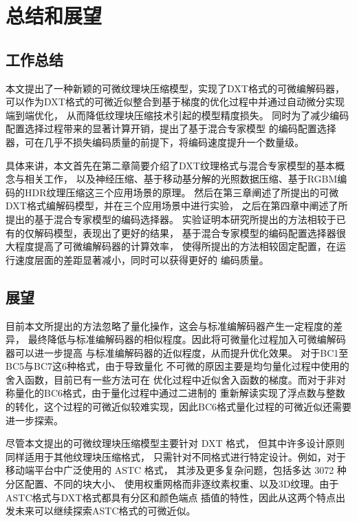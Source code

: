 
\chapter{总结和展望}

\section{工作总结}

本文提出了一种新颖的可微纹理块压缩模型，实现了DXT格式的可微编解码器，
可以作为DXT格式的可微近似整合到基于梯度的优化过程中并通过自动微分实现端到端优化，
从而降低纹理块压缩技术引起的模型精度损失。
同时为了减少编码配置选择过程带来的显著计算开销，提出了基于混合专家模型
的编码配置选择器，可在几乎不损失编码质量的前提下，将编码速度提升一个数量级。

具体来讲，本文首先在第二章简要介绍了DXT纹理格式与混合专家模型的基本概念与相关工作，
以及神经压缩、基于移动基分解的光照数据压缩、基于RGBM编码的HDR纹理压缩这三个应用场景的原理。
然后在第三章阐述了所提出的可微DXT格式编解码模型，并在三个应用场景中进行实验，
之后在第四章中阐述了所提出的基于混合专家模型的编码选择器。
实验证明本研究所提出的方法相较于已有的仅解码模型，表现出了更好的结果，
基于混合专家模型的编码配置选择器很大程度提高了可微编解码器的计算效率，
使得所提出的方法相较固定配置，在运行速度层面的差距显著减小，同时可以获得更好的
编码质量。

\section{展望}

目前本文所提出的方法忽略了量化操作，这会与标准编解码器产生一定程度的差异，
最终降低与标准编解码器的相似程度。因此将可微量化过程加入可微编解码器可以进一步提高
与标准编解码器的近似程度，从而提升优化效果。
对于BC1至BC5与BC7这6种格式，由于导致量化
不可微的原因主要是均匀量化过程中使用的舍入函数，目前已有一些方法可在
优化过程中近似舍入函数的梯度。而对于非对称量化的BC6格式，由于量化过程中通过二进制的
重新解读实现了浮点数与整数的转化，这个过程的可微近似较难实现，因此BC6格式量化过程的可微近似还需要进一步探索。

尽管本文提出的可微纹理块压缩模型主要针对 DXT 格式，
但其中许多设计原则同样适用于其他纹理块压缩格式，
只需针对不同格式进行特定设计。例如，对于移动端平台中广泛使用的 ASTC 格式，
其涉及更多复杂问题，包括多达 3072 种分区配置、不同的块大小、
使用权重网格而非逐纹素权重、以及3D纹理。由于ASTC格式与DXT格式都具有分区和颜色端点
插值的特性，因此从这两个特点出发未来可以继续探索ASTC格式的可微近似。


